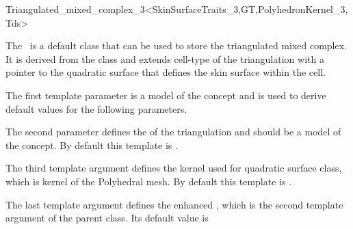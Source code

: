 
\ccRefPageBegin



\begin{ccRefClass}{Triangulated_mixed_complex_3<SkinSurfaceTraits_3,GT,PolyhedronKernel_3,Tds>}
\label{refTriangulatedmixedcomplex}

\ccDefinition 
%
The \ccRefName\ is a default class that can be used to
store the triangulated mixed complex. It is derived from the
 class and extends cell-type of the triangulation
with a pointer to the quadratic surface that defines the skin surface
within the cell.


\ccParameters 
%
The first template parameter  is a model of
the  concept and is used to derive default
values for the following parameters. 

The second parameter defines the  of the
triangulation and should be a model of the 
concept. By default this template is
.

The third template argument defines the kernel used for quadratic
surface class, which is kernel of the Polyhedral mesh. By default this
template is .

The last template argument defines the enhanced
, which is the second template
argument of the parent class. Its default value is

\ccInheritsFrom
{}

\ccSeeAlso
{}\\
\\


\end{ccRefClass}
